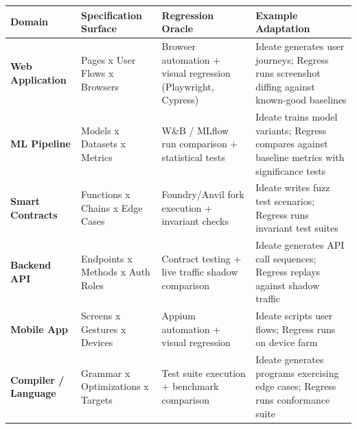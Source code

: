 \documentclass[11pt,a4paper]{article}
\newcounter{none} %
\begin{document}
{\small{} %
\begin{longtable}[]{@{}
  >{\raggedright\arraybackslash}p{}
  >{\raggedright\arraybackslash}p{}
  >{\raggedright\arraybackslash}p{}
  >{\raggedright\arraybackslash}p{}@{}}
\toprule\noalign{}
\begin{minipage}[b]{\linewidth}\raggedright
Domain
\end{minipage} & \begin{minipage}[b]{\linewidth}\raggedright
Specification Surface
\end{minipage} & \begin{minipage}[b]{\linewidth}\raggedright
Regression Oracle
\end{minipage} & \begin{minipage}[b]{\linewidth}\raggedright
Example Adaptation
\end{minipage} \\
\midrule\noalign{}
\endhead
\bottomrule\noalign{}
\endlastfoot
\textbf{Web Application} & Pages x User Flows x Browsers & Browser automation + visual regression (Playwright, Cypress) & Ideate generates user journeys; Regress runs screenshot diffing against known-good baselines \\
\textbf{ML Pipeline} & Models x Datasets x Metrics & W\&B / MLflow run comparison + statistical tests & Ideate trains model variants; Regress compares against baseline metrics with significance tests \\
\textbf{Smart Contracts} & Functions x Chains x Edge Cases & Foundry/Anvil fork execution + invariant checks & Ideate writes fuzz test scenarios; Regress runs invariant test suites \\
\textbf{Backend API} & Endpoints x Methods x Auth Roles & Contract testing + live traffic shadow comparison & Ideate generates API call sequences; Regress replays against shadow traffic \\
\textbf{Mobile App} & Screens x Gestures x Devices & Appium automation + visual regression & Ideate scripts user flows; Regress runs on device farm \\
\textbf{Compiler / Language} & Grammar x Optimizations x Targets & Test suite execution + benchmark comparison & Ideate generates programs exercising edge cases; Regress runs conformance suite \\
\end{longtable}
}
\end{document}

